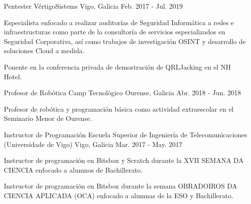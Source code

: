 \documentclass[11pt, a4paper]{style}
\begin{document}
\begin{cventries}
  \cventry
    {Pentester} %
    {VértigoSistems} %
    {Vigo, Galicia} %
    {Feb. 2017 - Jul. 2019} %
    {
      \begin{cvitems} %
        \item {Especialista enfocado a realizar auditorías de Seguridad Informática a redes e infraestructuras como parte de la consultoría de servicios especializados en Seguridad Corporativa, así como trabajos de investigación OSINT y desarrollo de soluciones Cloud a medida.}
        \item {Ponente en la conferencia privada de demostración de QRLJacking en el NH Hotel.}
      \end{cvitems}
    }
    \vspace{0.1cm}
  \cventry
    {Profesor de Robótica} %
    {Camp Tecnológico} %
    {Ourense, Galicia} %
    {Abr. 2018 - Jun. 2018} %
    {
      \begin{cvitems} %
        \item {Profesor de robótica y programación básica como actividad extraescolar en el Seminario Menor de Ourense.}
      \end{cvitems}
    }
    \vspace{0.1cm}
  \cventry
    {Instructor de Programación} %
    {Escuela Superior de Ingeniería de Telecomunicaciones (Universidade de Vigo)} %
    {Vigo, Galicia} %
    {Mar. 2017 - May. 2017} %
    {
      \begin{cvitems} %
        \item {Instructor de programación en Bitsbox y Scratch durante la XVII SEMANA DA CIENCIA enfocado a alumnos de Bachillerato.}
        \item {Instructor de programación en Bitsbox durante la semana OBRADOIROS DA CIENCIA APLICADA (OCA) enfocado a alumnas de la ESO y Bachillerato.}
      \end{cvitems}
    }
\end{cventries}
\end{document}
